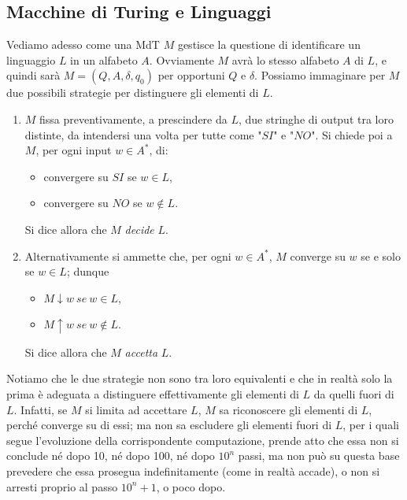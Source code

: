 \subsection{Macchine di Turing e Linguaggi}

Vediamo adesso come una MdT $M$ gestisce la questione di identificare un linguaggio
$L$ in un alfabeto $A$. Ovviamente $M$ avrà lo stesso alfabeto $A$ di $L$, e quindi
sarà $M = (Q, A, \delta, q_0)$ per opportuni $Q$ e $\delta$. Possiamo immaginare per
$M$ due possibili strategie per distinguere gli elementi di $L$.

\begin{enumerate}
    \item $M$ fissa preventivamente, a prescindere da $L$, due stringhe di output
          tra loro distinte, da intendersi una volta per tutte come "$SI$" e "$NO$".
          Si chiede poi a $M$, per ogni input $w \in A^*$, di:
          \begin{itemize}
              \item convergere su $SI$ se $w \in L$,
              \item convergere su $NO$ se $w \notin L$.
          \end{itemize}
          Si dice allora che $M$ \textit{decide} $L$.
    \item Alternativamente si ammette che, per ogni $w \in A^*$, $M$ converge su
          $w$ se e solo se $w \in L$; dunque
          \begin{itemize}
              \item $M \downarrow w \ se \ w \in L$,
              \item $M \uparrow w \ se \ w \notin L$.
          \end{itemize}
          Si dice allora che $M$ \textit{accetta} $L$.
\end{enumerate}

Notiamo che le due strategie non sono tra loro equivalenti e che in realtà solo la
prima è adeguata a distinguere effettivamente gli elementi di $L$ da quelli fuori di
$L$. Infatti, se $M$ si limita ad accettare $L$, $M$ sa riconoscere gli elementi
di $L$, perché converge su di essi; ma non sa escludere gli elementi fuori di $L$,
per i quali segue l'evoluzione della corrispondente computazione, prende atto che
essa non si conclude né dopo 10, né dopo 100, né dopo $10^n$ passi, ma non può su
questa base prevedere che essa prosegua indefinitamente (come in realtà accade), o
non si arresti proprio al passo $10^n + 1$, o poco dopo.

